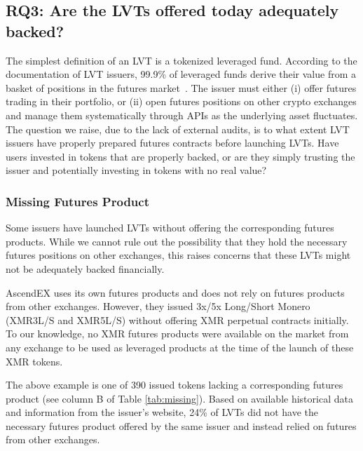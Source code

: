 \subsection*{RQ3: Are the LVTs offered today adequately backed?}\label{subsec:backing}
The simplest definition of an LVT is a tokenized leveraged fund. According to the documentation of LVT issuers, 99.9\% of leveraged funds derive their value from a basket of positions in the futures market~\cite{AscendEX_Guide,MEXC_Guide,Binance_Guide,ByBit_Guide,ByDFi_Guide,FTX_Guide,GateIO_Guide,KuCoin_Guide,Pionex_Guide}. The issuer must either (i) offer futures trading in their portfolio, or (ii) open futures positions on other crypto exchanges and manage them systematically through APIs as the underlying asset fluctuates. The question we raise, due to the lack of external audits, is to what extent LVT issuers have properly prepared futures contracts before launching LVTs. Have users invested in tokens that are properly backed, or are they simply trusting the issuer and potentially investing in tokens with no real value?

\subsubsection{Missing Futures Product}
Some issuers have launched LVTs without offering the corresponding futures products. While we cannot rule out the possibility that they hold the necessary futures positions on other exchanges, this raises concerns that these LVTs might not be adequately backed financially.

\begin{example}
	AscendEX uses its own futures products and does not rely on futures products from other exchanges. However, they issued 3x/5x Long/Short Monero (XMR3L/S and XMR5L/S) without offering XMR perpetual contracts initially. To our knowledge, no XMR futures products were available on the market from any exchange to be used as leveraged products at the time of the launch of these XMR tokens.
\end{example}

The above example is one of 390 issued tokens lacking a corresponding futures product (see column B of Table \ref{tab:missing}). Based on available historical data and information from the issuer's website, 24\% of LVTs did not have the necessary futures product offered by the same issuer and instead relied on futures from other exchanges.


